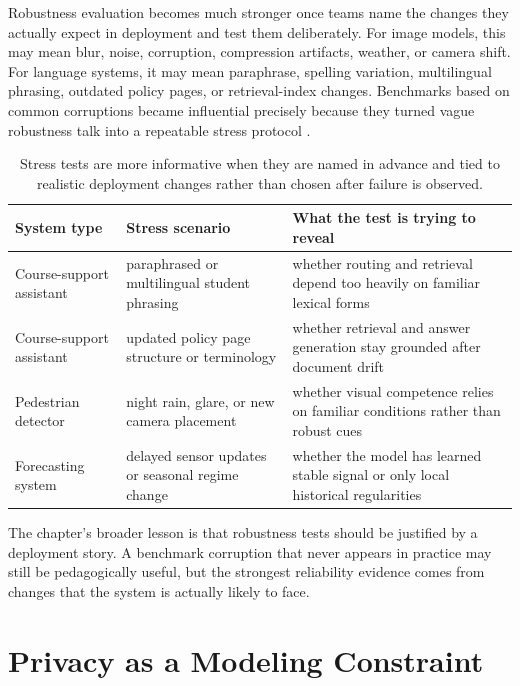 Robustness evaluation becomes much stronger once teams name the changes they actually expect in deployment and test them deliberately. For image models, this may mean blur, noise, corruption, compression artifacts, weather, or camera shift. For language systems, it may mean paraphrase, spelling variation, multilingual phrasing, outdated policy pages, or retrieval-index changes. Benchmarks based on common corruptions became influential precisely because they turned vague robustness talk into a repeatable stress protocol \citep{hendrycks2019}.

\begin{table}[t]
\centering
\small
\setlength{\tabcolsep}{4pt}
\begin{tabular}{p{2.91cm}p{3.07cm}p{3.96cm}}
\toprule
System type & Stress scenario & What the test is trying to reveal \\
\midrule
Course-support assistant & paraphrased or multilingual student phrasing & whether routing and retrieval depend too heavily on familiar lexical forms \\
Course-support assistant & updated policy page structure or terminology & whether retrieval and answer generation stay grounded after document drift \\
Pedestrian detector & night rain, glare, or new camera placement & whether visual competence relies on familiar conditions rather than robust cues \\
Forecasting system & delayed sensor updates or seasonal regime change & whether the model has learned stable signal or only local historical regularities \\
\bottomrule
\end{tabular}
\caption{Stress tests are more informative when they are named in advance and tied to realistic deployment changes rather than chosen after failure is observed.}
\label{tab:reliability-stress-tests}
\end{table}

The chapter's broader lesson is that robustness tests should be justified by a deployment story. A benchmark corruption that never appears in practice may still be pedagogically useful, but the strongest reliability evidence comes from changes that the system is actually likely to face.

\section{Privacy as a Modeling Constraint}

